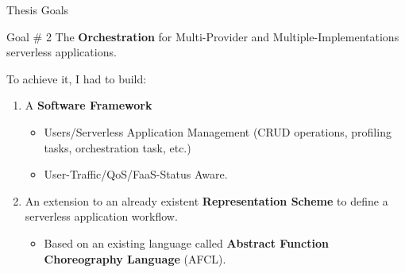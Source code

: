 \documentclass[13.5pt]{beamer}
\newcommand{\B}[1]{\textcolor{TorVergataColor}{\textbf{#1}}}
\begin{document}

\begin{frame}{Thesis Goals}
	
	\begin{block}{Goal $\#$ 2}
		\centering
		The \B{Orchestration} for Multi-Provider and Multiple-Implementations serverless applications. 
	\end{block}
	
	\vspace{\baselineskip}
	To achieve it, I had to build:
	\vspace{\baselineskip}

	\begin{enumerate}
		\justifying
	
		\item A \B{Software Framework}
			\begin{itemize}
				\item Users/Serverless Application Management (CRUD operations, profiling tasks, orchestration task, etc.)
				\item User-Traffic/QoS/FaaS-Status Aware.
			\end{itemize}
		
		\vspace{\baselineskip} 
		\item An extension to an already existent \B{Representation Scheme} to define a serverless application workflow.
		\begin{itemize}
			\item Based on an existing language called \B{Abstract Function Choreography Language} (AFCL).
		\end{itemize}
		
	\end{enumerate}
	
\end{frame} 

\end{document}
